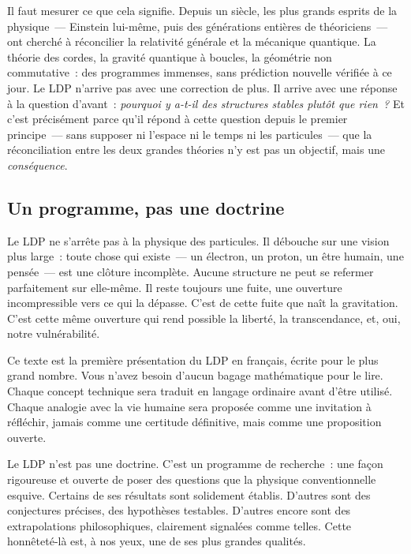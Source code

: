 \documentclass[12pt, a4paper, openright]{book}
\begin{document}
\medskip

Il faut mesurer ce que cela signifie. Depuis un siècle, les plus grands esprits de la physique~--- Einstein lui-même, puis des générations entières de théoriciens~--- ont cherché à réconcilier la relativité générale et la mécanique quantique. La théorie des cordes, la gravité quantique à boucles, la géométrie non commutative~: des programmes immenses, sans pré\-diction nouvelle vérifiée à ce jour. Le LDP n'arrive pas avec une correction de plus. Il arrive avec une réponse à la question d'avant~: \emph{pourquoi y a-t-il des structures stables plutôt que rien~?} Et c'est précisément parce qu'il répond à cette question depuis le premier principe~--- sans supposer ni l'espace ni le temps ni les particules~--- que la réconciliation entre les deux grandes théories n'y est pas un objectif, mais une \emph{conséquence}.

\subsection*{Un programme, pas une doctrine}

Le LDP ne s'arrête pas à la physique des particules. Il débouche sur une vision plus large~: toute chose qui existe~--- un électron, un proton, un être humain, une pensée~--- est une clôture incomplète. Aucune structure ne peut se refermer parfaitement sur elle-même. Il reste toujours une fuite, une ouverture incompressible vers ce qui la dépasse. C'est de cette fuite que naît la gravitation. C'est cette même ouverture qui rend possible la liberté, la transcendance, et, oui, notre vulnérabilité.

\medskip

Ce texte est la première présentation du LDP en français, écrite pour le plus grand nombre. Vous n'avez besoin d'aucun bagage mathématique pour le lire. Chaque concept technique sera traduit en langage ordinaire avant d'être utilisé. Chaque analogie avec la vie humaine sera proposée comme une invitation à réfléchir, jamais comme une certitude définitive, mais comme une proposition ouverte.

\medskip

Le LDP n'est pas une doctrine. C'est un programme de recherche~: une façon rigoureuse et ouverte de poser des questions que la physique conventionnelle esquive. Certains de ses résultats sont solidement établis. D'autres sont des conjectures précises, des hypothèses testables. D'autres encore sont des extrapolations philosophiques, clairement signalées comme telles. Cette honnêteté-là est, à nos yeux, une de ses plus grandes qualités.
\end{document}
